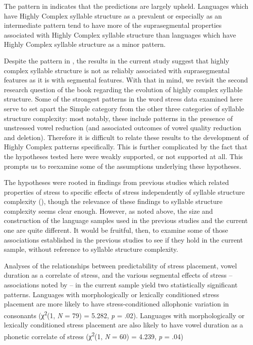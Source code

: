   The pattern in  indicates that the predictions are largely upheld. Languages which have Highly Complex syllable structure as a prevalent or especially as an intermediate pattern tend to have more of the suprasegmental properties associated with Highly Complex syllable structure than languages which have Highly Complex syllable structure as a minor pattern.

  Despite the pattern in , the results in the current study suggest that highly complex syllable structure is not as reliably associated with suprasegmental features as it is with segmental features. With that in mind, we revisit the second research question of the book regarding the evolution of highly complex syllable structure. Some of the strongest patterns in the word stress data examined here serve to set apart the Simple category from the other three categories of syllable structure complexity: most notably, these include patterns in the presence of unstressed vowel reduction (and associated outcomes of vowel quality reduction and deletion). Therefore it is difficult to relate these results to the development of Highly Complex patterns specifically. This is further complicated by the fact that the hypotheses tested here were weakly supported, or not supported at all. This prompts us to reexamine some of the assumptions underlying these hypotheses.

  The hypotheses were rooted in findings from previous studies which related properties of stress to specific effects of stress independently of syllable structure complexity (\citealt{BybeeEtAl1998,Schiering2007}), though the relevance of these findings to syllable structure complexity seems clear enough. However, as noted above, the size and construction of the language samples used in the previous studies and the current one are quite different. It would be fruitful, then, to examine some of those associations established in the previous studies to see if they hold in the current sample, without reference to syllable structure complexity.

  Analyses of the relationships between predictability of stress placement, vowel duration as a correlate of stress, and the various segmental effects of stress -- associations noted by \citet{BybeeEtAl1998} -- in the current sample yield two statistically significant patterns. Languages with morphologically or lexically conditioned stress placement are more likely to have stress-conditioned allophonic variation in consonants (χ\textsuperscript{2}(1, \textit{N} = 79) = 5.282, \textit{p} = .02). Languages with morphologically or lexically conditioned stress placement are also likely to have vowel duration as a phonetic correlate of stress (χ\textsuperscript{2}(1, \textit{N} = 60) = 4.239, \textit{p} = .04)

